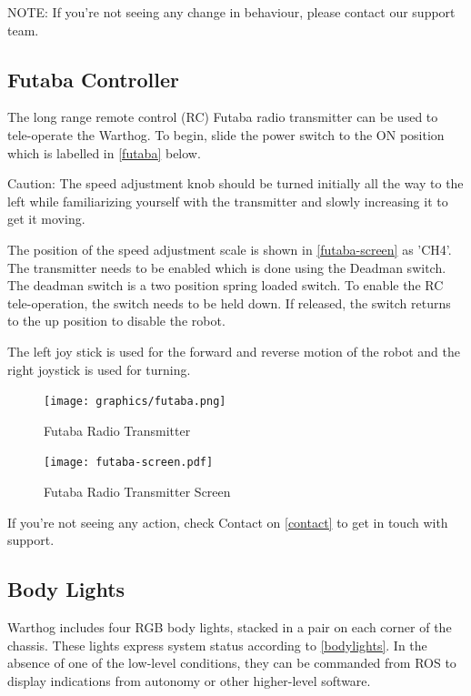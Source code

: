 \documentclass[]{clearpath-latex/clearpath-manual}
\begin{document}
NOTE: If you’re not seeing any change in behaviour, please contact our support team.

\pagebreak[4]

\subsection{Futaba Controller}

The long range remote control (RC) Futaba radio transmitter can be used to tele-operate the Warthog.
To begin, slide the power switch to the ON position which is labelled in
\autoref{futaba} below.

\begin{warning}[]
Caution: The speed adjustment knob should be turned initially all the way to the left while familiarizing yourself with the transmitter and slowly increasing it to get it moving.
\end{warning}

The position of the speed adjustment scale is shown in \autoref{futaba-screen} as 'CH4'.
The transmitter needs to be enabled which is done using the Deadman switch.  The deadman switch is a two position spring loaded switch.  To enable the RC tele-operation, the switch needs to be held down.  If released, the switch returns to the up position to disable the robot.

The left joy stick is used for the forward and reverse motion of the robot and the right joystick is used for turning.

\begin{figure}[!h]
  \centering
  \texttt{[image: graphics/futaba.png]}
  \caption{Futaba Radio Transmitter}
  \label{futaba}
\end{figure}

\begin{figure}[!h]
  \centering
  \texttt{[image: futaba-screen.pdf]}
  \caption{Futaba Radio Transmitter Screen}
  \label{futaba-screen}
\end{figure}

If you’re not seeing any action, check Contact on \autoref{contact} to get in touch with support.


\pagebreak[4]

\subsection{Body Lights}

Warthog includes four RGB body lights, stacked in a pair on each corner of the chassis. These lights express system status according to \autoref{bodylights}. In the absence of one of the low-level conditions, they can be commanded from ROS to display indications from autonomy or other higher-level software.
\end{document}
